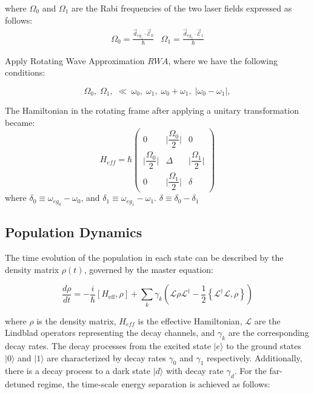 \documentclass{article}
\begin{document}
where \(\Omega_0\) and \(\Omega_1\) are the Rabi frequencies of the two laser fields expressed as follows:
$$
\begin{array}{ll}
\Omega_0=\frac{\vec{d}_{e g_1} \cdot \overrightarrow{\mathcal{E}}_0}{\hbar} & \Omega_1=\frac{\vec{d}_{e g_2} \cdot \overrightarrow{\mathcal{E}}_1}{\hbar} 
\end{array}
$$



Apply Rotating Wave Approximation \(RWA\), where we have the following conditions:

$$ \Omega_0,\; \Omega_1,\; 
\ll ~\omega_0,\; \omega_1,\; \omega_0+\omega_1,\; |\omega_0-\omega_1|,
$$

The Hamiltonian in the rotating frame after applying a unitary transformation became:
\begin{equation}
H_{eff} = \hbar \begin{pmatrix}
    0 & \bigg\rvert\dfrac{\Omega_0}{2}\bigg\rvert & 0\\
    \bigg\rvert\dfrac{\Omega_0}{2}\bigg\rvert & \Delta & \bigg\rvert\dfrac{\Omega_1}{2}\bigg\rvert\\
    0 & \bigg\rvert\dfrac{\Omega_1}{2}\bigg\rvert & \delta
\end{pmatrix}
\end{equation}
where $\delta_0 \equiv \omega_{eg_0} -\omega_0$, and $\delta_1 \equiv \omega_{eg_1} -\omega_1$.
$\delta \equiv \delta_0 - \delta_1$ 


\subsection{Population Dynamics}
The time evolution of the population in each state can be described by the density matrix $\rho(t)$, governed by the master equation:

\begin{equation}
    \frac{d\rho}{dt} = -\frac{i}{\hbar}[H_{\text{eff}}, \rho] + \sum_k \gamma_k \left(  \mathcal{L} \rho  \mathcal{L}^\dagger - \frac{1}{2} \left\{  \mathcal{L}^\dagger  \mathcal{L}, \rho \right\} \right)
\end{equation}
    


where \(\rho\) is the density matrix, \(H_{eff}\) is the effective  Hamiltonian, $\mathcal{L}$ are the Lindblad operators representing the decay channels, and \(\gamma_k\) are the corresponding decay rates.
The decay processes from the excited state $|e\rangle$ to the ground states $|0\rangle$ and $|1\rangle$ are characterized by decay rates $\gamma_0$ and $\gamma_1$ respectively. Additionally, there is a decay process to a dark state $|d\rangle$ with decay rate $\gamma_d$.
For the far-detuned regime, the time-scale energy separation is achieved as follows:
\end{document}
